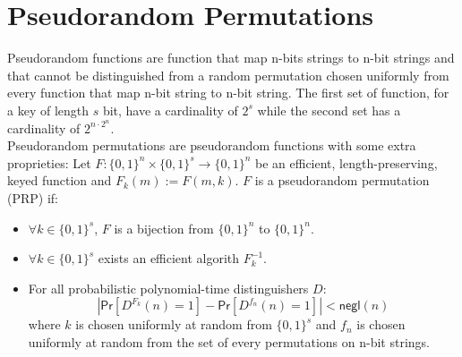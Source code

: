 \section{Pseudorandom Permutations}
Pseudorandom functions are function that map n-bits strings to n-bit strings and that cannot be distinguished from a random permutation chosen uniformly from every function that map n-bit string to n-bit string.
The first set of function, for a key of length $s$ bit, have a cardinality of $2^{s}$ while the second set has a cardinality of $2^{n\cdot2^n}$.\\
Pseudorandom permutations are pseudorandom functions with some extra proprieties:
Let $F : \{0,1\}^{n} \times \{0,1\}^{s} \rightarrow \{0,1\}^{n}$ be an efficient, length-preserving, keyed function and $F_k(m) := F(m, k)$.
$F$ is a pseudorandom permutation (PRP) if:
\begin{itemize}
    \item{$\forall k \in \{0,1\}^{s}$, $F$ is a bijection from $\{0,1\}^{n}$ to $\{0,1\}^{n}$}.
    \item{$\forall k \in \{0,1\}^{s}$ exists an efficient algorith $F^{-1}_k$.}
    \item{For all probabilistic polynomial-time distinguishers $D$:
        $$
            |\mathsf{Pr}[D^{F_k}(n) = 1] - \mathsf{Pr}[D^{f_n}(n) = 1]| < \mathsf{negl}(n)
        $$
        where $k$ is chosen uniformly at random from $\{0,1\}^{s}$ and $f_n$ is chosen uniformly at random from the set of every permutations on n-bit strings.
        }
\end{itemize}

